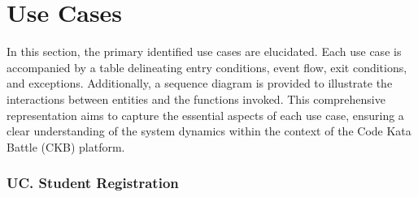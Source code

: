 \section{Use Cases}
\label{subsec: use_case}%
\setcounter{uc}{1}
\newcommand{\cuc}{\theuc\stepcounter{uc}}
In this section, the primary identified use cases are elucidated. 
Each use case is accompanied by a table delineating entry conditions, event flow, exit conditions, and exceptions. 
Additionally, a sequence diagram is provided to illustrate the interactions between entities and the functions invoked. 
This comprehensive representation aims to capture the essential aspects of each use case, ensuring a clear understanding of the system dynamics within the context of the Code Kata Battle (CKB) platform.
\subsubsection*{UC\cuc . Student Registration}
